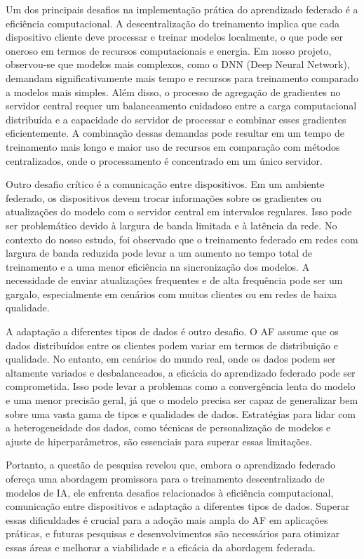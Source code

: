 Um dos principais desafios na implementação prática do aprendizado federado é a eficiência computacional. A descentralização do treinamento implica que cada dispositivo cliente deve processar e treinar modelos localmente, o que pode ser oneroso em termos de recursos computacionais e energia. Em nosso projeto, observou-se que modelos mais complexos, como o DNN (Deep Neural Network), demandam significativamente mais tempo e recursos para treinamento comparado a modelos mais simples. Além disso, o processo de agregação de gradientes no servidor central requer um balanceamento cuidadoso entre a carga computacional distribuída e a capacidade do servidor de processar e combinar esses gradientes eficientemente. A combinação dessas demandas pode resultar em um tempo de treinamento mais longo e maior uso de recursos em comparação com métodos centralizados, onde o processamento é concentrado em um único servidor.

Outro desafio crítico é a comunicação entre dispositivos. Em um ambiente federado, os dispositivos devem trocar informações sobre os gradientes ou atualizações do modelo com o servidor central em intervalos regulares. Isso pode ser problemático devido à largura de banda limitada e à latência da rede. No contexto do nosso estudo, foi observado que o treinamento federado em redes com largura de banda reduzida pode levar a um aumento no tempo total de treinamento e a uma menor eficiência na sincronização dos modelos. A necessidade de enviar atualizações frequentes e de alta frequência pode ser um gargalo, especialmente em cenários com muitos clientes ou em redes de baixa qualidade.

A adaptação a diferentes tipos de dados é outro desafio. O AF assume que os dados distribuídos entre os clientes podem variar em termos de distribuição e qualidade. No entanto, em cenários do mundo real, onde os dados podem ser altamente variados e desbalanceados, a eficácia do aprendizado federado pode ser comprometida. Isso pode levar a problemas como a convergência lenta do modelo e uma menor precisão geral, já que o modelo precisa ser capaz de generalizar bem sobre uma vasta gama de tipos e qualidades de dados. Estratégias para lidar com a heterogeneidade dos dados, como técnicas de personalização de modelos e ajuste de hiperparâmetros, são essenciais para superar essas limitações.

Portanto, a questão de pesquisa revelou que, embora o aprendizado federado ofereça uma abordagem promissora para o treinamento descentralizado de modelos de IA, ele enfrenta desafios  relacionados à eficiência computacional, comunicação entre dispositivos e adaptação a diferentes tipos de dados. Superar essas dificuldades é crucial para a adoção mais ampla do AF em aplicações práticas, e futuras pesquisas e desenvolvimentos são necessários para otimizar essas áreas e melhorar a viabilidade e a eficácia da abordagem federada.

